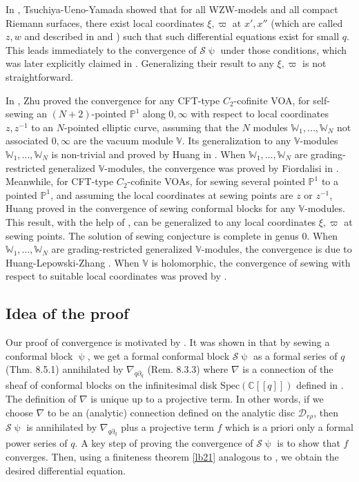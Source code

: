 \documentclass[12pt,a4paper,notitlepage]{article}
\theoremstyle{definition}
\theoremstyle{plain}
\newcommand{\mc}{\mathcal}
\newcommand{\Vbb}{\mathbb V}
\newcommand{\Wbb}{\mathbb W}
\newcommand{\Cbb}{\mathbb C}
\newcommand{\Pbb}{\mathbb P}
\numberwithin{equation}{section}
\begin{document}
In \cite{TUY89}, Tsuchiya-Ueno-Yamada showed that for all WZW-models and all compact Riemann surfaces, there exist local coordinates $\xi,\varpi$ at $x',x''$ (which are called $z,w$ and described in \cite[Lemma 6.1.2]{TUY89} and \cite[Lemma 5.3.1]{Ueno97}) such that such differential equations exist for small $q$. This leads immediately to the convergence of $\mc S\uppsi$ under those conditions, which was later explicitly claimed in \cite[Thm. 5.3.4]{Ueno97}. Generalizing their result  to any $\xi,\varpi$ is not  straightforward.  


In \cite{Zhu96}, Zhu proved the convergence for any CFT-type $C_2$-cofinite VOA,  for  self-sewing an $(N+2)$-pointed $\Pbb^1$ along $0,\infty$ with respect to local coordinates $z,z^{-1}$ to an $N$-pointed elliptic curve,  assuming that the $N$ modules $\Wbb_1,\dots,\Wbb_N$ not associated $0,\infty$ are the vacuum module $\Vbb$.  Its generalization to any $\Vbb$-modules $\Wbb_1,\dots,\Wbb_N$ is non-trivial and proved by Huang in \cite{Hua05b}. When  $\Wbb_1,\dots,\Wbb_N$ are grading-restricted generalized $\Vbb$-modules, the convergence was proved by Fiordalisi in \cite{Fio16}.  Meanwhile, for CFT-type $C_2$-cofinite VOAs, for sewing several pointed $\Pbb^1$ to a pointed  $\Pbb^1$, and assuming the local coordinates at sewing points are $z$ or $z^{-1}$, Huang proved in \cite{Hua05a} the convergence of sewing conformal blocks for any $\Vbb$-modules. This result, with the help of \cite{Hua98}, can be generalized to any local coordinates $\xi,\varpi$ at sewing points. The solution of sewing conjecture is complete in genus $0$. When $\Wbb_1,\dots,\Wbb_N$ are grading-restricted generalized $\Vbb$-modules, the convergence is due to Huang-Lepowski-Zhang \cite{HLZ11}. When $\Vbb$ is holomorphic, the convergence of sewing with respect to suitable local coordinates was proved by \cite{Cod19}.




\subsection*{Idea of the proof}

Our proof of convergence is  motivated by \cite{DGT19b}. It was shown in \cite{DGT19b} that by sewing a conformal block $\uppsi$, we get a formal conformal block $\mc S\uppsi$ as a formal series of $q$ (Thm. 8.5.1)  annihilated by $\nabla_{q\partial_q}$ (Rem. 8.3.3) where $\nabla$ is a connection of the sheaf of conformal blocks on the infinitesimal disk $\mathrm{Spec}(\Cbb[[q]])$ defined in \cite{DGT19a}. The definition of $\nabla$ is unique up to a projective term. In other words, if we choose $\nabla$ to be an (analytic) connection defined on the analytic disc $\mc D_{r\rho}$, then $\mc S\uppsi$ is annihilated by $\nabla_{q\partial_q}$ plus a projective term $f$ which  is a priori only a formal power series of $q$. A key step of proving the convergence of $\mc S\uppsi$ is to show that $f$ converges. Then, using a finiteness theorem \ref{lb21} analogous to \cite[Thm. 8.4.1]{DGT19b}, we obtain the desired differential equation.
\end{document}
